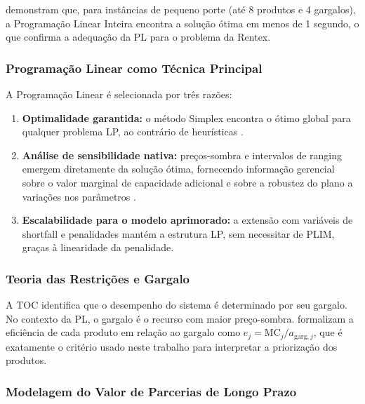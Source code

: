 \textcite{sobreiro2013} demonstram que, para instâncias de pequeno porte (até
8 produtos e 4 gargalos), a Programação Linear Inteira encontra a solução ótima
em menos de 1 segundo, o que confirma a adequação da PL para o problema da Rentex.

\subsubsection{Programação Linear como Técnica Principal}

A Programação Linear é selecionada por três razões:

\begin{enumerate}[label=\textbf{(\alph*)}]
  \item \textbf{Optimalidade garantida:} o método Simplex encontra o ótimo global
        para qualquer problema LP, ao contrário de heurísticas \cite{hillier2006}.

  \item \textbf{Análise de sensibilidade nativa:} preços-sombra e intervalos de
        ranging emergem diretamente da solução ótima, fornecendo informação
        gerencial sobre o valor marginal de capacidade adicional e sobre a
        robustez do plano a variações nos parâmetros \cite{winston2002}.

  \item \textbf{Escalabilidade para o modelo aprimorado:} a extensão com
        variáveis de shortfall e penalidades mantém a estrutura LP, sem necessitar
        de PLIM, graças à linearidade da penalidade.
\end{enumerate}

\subsubsection{Teoria das Restrições e Gargalo}

A TOC \cite{goldratt2006} identifica que o desempenho do sistema é determinado
por seu gargalo. No contexto da PL, o gargalo é o recurso com maior preço-sombra.
\textcite{sobreiro2013} formalizam a eficiência de cada produto em relação ao
gargalo como $e_j = \mathrm{MC}_j / a_{\text{garg},j}$, que é exatamente o
critério usado neste trabalho para interpretar a priorização dos produtos.

\subsubsection{Modelagem do Valor de Parcerias de Longo Prazo}

